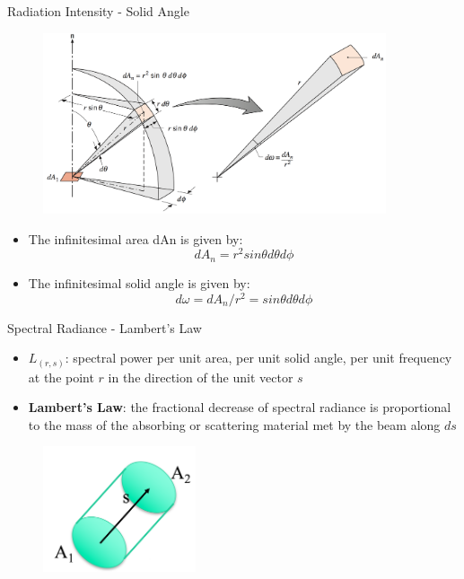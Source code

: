 
\begin{frame}{Radiation Intensity - Solid Angle}
\begin{figure}
	\includegraphics[width=0.9\textwidth]{fig13.png}
\end{figure}
\begin{itemize}
	\item The infinitesimal area dAn is given by: 
	$$dA_n = r^2sin\theta d\theta d\phi$$
	\item The infinitesimal solid angle is given by:
	$$d\omega = dA_n/r^2 = \boxed{sin\theta d\theta d\phi}$$
\end{itemize}
\end{frame}


\begin{frame}{Spectral Radiance - Lambert's Law}
\begin{itemize}
	\item $L_{(r,s)}$: spectral power per unit area, per unit solid angle, per unit frequency at the point $r$ in the direction of the unit vector $s$
	\item \textbf{Lambert's Law}: the fractional decrease of spectral radiance is proportional to the mass of the absorbing or scattering material met by the beam along $ds$
\end{itemize}
\begin{figure}
	\includegraphics[width=0.4\textwidth]{fig14.png}
\end{figure}
\end{frame}


